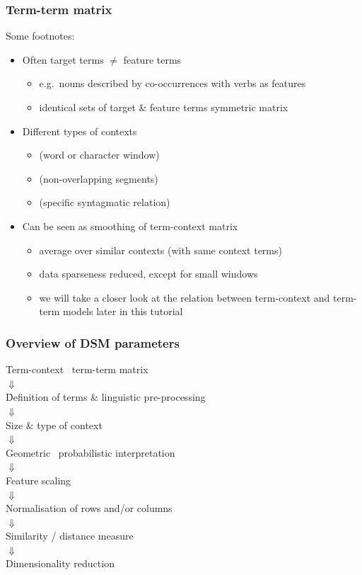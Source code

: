 \begin{frame}
  \frametitle{Term-term matrix}

  Some footnotes:
  \begin{itemize}
  \item Often target terms $\neq$ feature terms
    \begin{itemize}
    \item e.g.\ nouns described by co-occurrences with verbs as features
    \item identical sets of target \& feature terms \so symmetric matrix
    \end{itemize}
  \item Different types of contexts \citep{Evert:08}
    \begin{itemize}
    \item {} (word or character window)
    \item {} (non-overlapping segments)
    \item {} (specific syntagmatic relation)
    \end{itemize}
  \item Can be seen as smoothing of term-context matrix
    \begin{itemize}
    \item average over similar contexts (with same context terms)
    \item data sparseness reduced, except for small windows
    \item we will take a closer look at the relation between term-context and term-term models later in this tutorial
    \end{itemize}
  \end{itemize}

\end{frame}

\begin{frame}
  \frametitle{Overview of DSM parameters}

  \ungap[1]
  \begin{center}
    Term-context \vs\ term-term matrix\\
    $\Downarrow$\\
    \h{Definition of terms \& linguistic pre-processing}\\
    $\Downarrow$\\
    Size \& type of context\\
    $\Downarrow$\\
    Geometric \vs\ probabilistic interpretation\\
    $\Downarrow$\\
    Feature scaling\\
    $\Downarrow$\\
    Normalisation of rows and/or columns\\
    $\Downarrow$\\
    Similarity / distance measure\\
    $\Downarrow$\\
    Dimensionality reduction
  \end{center}
\end{frame}

